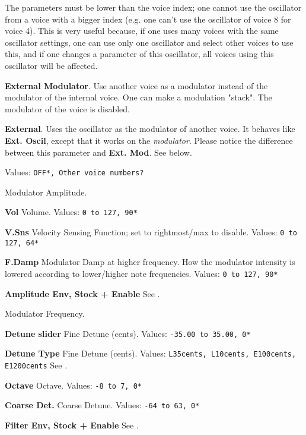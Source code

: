    The parameters must be lower than the voice index; one cannot use the
   oscillator from a voice with a bigger index (e.g. one can't use the
   oscillator of voice 8 for voice 4). This is very useful because, if
   one uses many voices with the same oscillator settings, one can use only
   one oscillator and select other voices to use this, and if one changes a
   parameter of this oscillator, all voices using this oscillator will be
   affected.

   \textbf{External Modulator}.
   Use another voice as a modulator instead of the modulator of the internal
   voice. One can make a modulation "stack". The modulator of the voice is
   disabled. 

   \textbf{External}.
   Uses the oscillator as the modulator of another voice. It
   behaves like \textbf{Ext. Oscil}, except that it works on the
   \textsl{modulator}. Please
   notice the difference between this parameter and \textbf{Ext. Mod}. 
   See below.

   Values: \texttt{OFF*, Other voice numbers?}

   Modulator Amplitude.

   \begin{enumber}
      \item \textbf{Vol}
         Volume.
         Values: \texttt{0 to 127, 90*}
      \item \textbf{V.Sns}
         Velocity Sensing Function; set to rightmost/max to disable.
         Values: \texttt{0 to 127, 64*}
      \item \textbf{F.Damp}
         Modulator Damp at higher frequency.
         How the modulator intensity is lowered according to lower/higher
         note frequencies. 
         Values: \texttt{0 to 127, 90*}
      \item \textbf{Amplitude Env, Stock + Enable}
         See .
   \end{enumber}

   Modulator Frequency.

   \begin{enumber}
      \item \textbf{Detune slider}
         Fine Detune (cents).
         Values: \texttt{-35.00 to 35.00, 0*}
      \item \textbf{Detune Type}
         Fine Detune (cents).
         Values: \texttt{L35cents, L10cents, E100cents, E1200cents}
         See .
      \item \textbf{Octave}
         Octave.
         Values: \texttt{-8 to 7, 0*}
      \item \textbf{Coarse Det.}
         Coarse Detune.
         Values: \texttt{-64 to 63, 0*}
      \item \textbf{Filter Env, Stock + Enable}
         See .
   \end{enumber}

